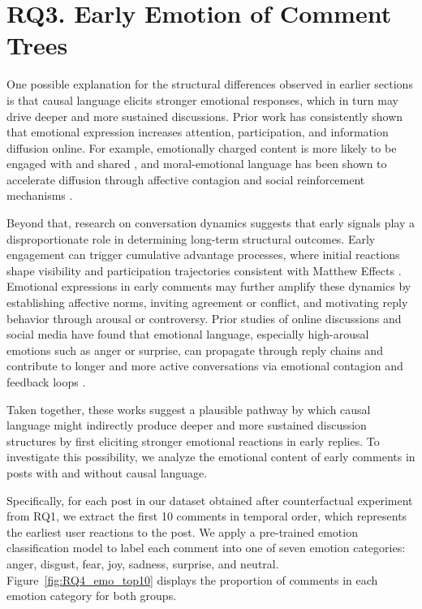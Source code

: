 \documentclass[acmsmall]{acmart}
\begin{document}
\section{RQ3. Early Emotion of Comment Trees}

One possible explanation for the structural differences observed in earlier sections is that causal language elicits stronger emotional responses, which in turn may drive deeper and more sustained discussions. Prior work has consistently shown that emotional expression increases attention, participation, and information diffusion online. For example, emotionally charged content is more likely to be engaged with and shared \cite{berger2012makes}, and moral-emotional language has been shown to accelerate diffusion through affective contagion and social reinforcement mechanisms \cite{brady2017emotion}.

Beyond that, research on conversation dynamics suggests that early signals play a disproportionate role in determining long-term structural outcomes. Early engagement can trigger cumulative advantage processes, where initial reactions shape visibility and participation trajectories consistent with Matthew Effects \cite{muchnik2013social, cheng2014can}. Emotional expressions in early comments may further amplify these dynamics by establishing affective norms, inviting agreement or conflict, and motivating reply behavior through arousal or controversy. Prior studies of online discussions and social media have found that emotional language, especially high-arousal emotions such as anger or surprise, can propagate through reply chains and contribute to longer and more active conversations via emotional contagion and feedback loops \cite{stieglitz2013emotions, brady2017emotion}.


Taken together, these works suggest a plausible pathway by which causal language might indirectly produce deeper and more sustained discussion structures by first eliciting stronger emotional reactions in early replies. To investigate this possibility, we analyze the emotional content of early comments in posts with and without causal language.


Specifically, for each post in our dataset obtained after counterfactual experiment from RQ1, we extract the first 10 comments in temporal order, which represents the earliest user reactions to the post. We apply a pre-trained emotion classification model \cite{hartmann2022emotionenglish} to label each comment into one of seven emotion categories: anger, disgust, fear, joy, sadness, surprise, and neutral. Figure~\ref{fig:RQ4_emo_top10} displays the proportion of comments in each emotion category for both groups.
\end{document}
